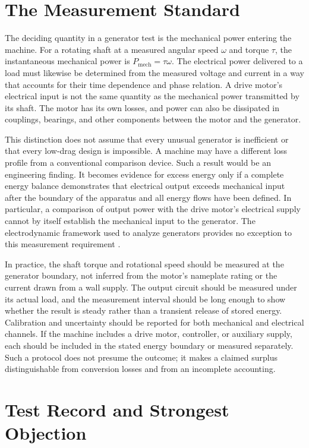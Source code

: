\documentclass[11pt]{article}
\begin{document}
\section{The Measurement Standard}

The deciding quantity in a generator test is the mechanical power entering the machine. For a rotating shaft at a measured angular speed $\omega$ and torque $\tau$, the instantaneous mechanical power is $P_{\mathrm{mech}}=\tau\omega$. The electrical power delivered to a load must likewise be determined from the measured voltage and current in a way that accounts for their time dependence and phase relation. A drive motor's electrical input is not the same quantity as the mechanical power transmitted by its shaft. The motor has its own losses, and power can also be dissipated in couplings, bearings, and other components between the motor and the generator.

This distinction does not assume that every unusual generator is inefficient or that every low-drag design is impossible. A machine may have a different loss profile from a conventional comparison device. Such a result would be an engineering finding. It becomes evidence for excess energy only if a complete energy balance demonstrates that electrical output exceeds mechanical input after the boundary of the apparatus and all energy flows have been defined. In particular, a comparison of output power with the drive motor's electrical supply cannot by itself establish the mechanical input to the generator. The electrodynamic framework used to analyze generators provides no exception to this measurement requirement \cite{Jackson1999}.

In practice, the shaft torque and rotational speed should be measured at the generator boundary, not inferred from the motor's nameplate rating or the current drawn from a wall supply. The output circuit should be measured under its actual load, and the measurement interval should be long enough to show whether the result is steady rather than a transient release of stored energy. Calibration and uncertainty should be reported for both mechanical and electrical channels. If the machine includes a drive motor, controller, or auxiliary supply, each should be included in the stated energy boundary or measured separately. Such a protocol does not presume the outcome; it makes a claimed surplus distinguishable from conversion losses and from an incomplete accounting.

\section{Test Record and Strongest Objection}
\end{document}
